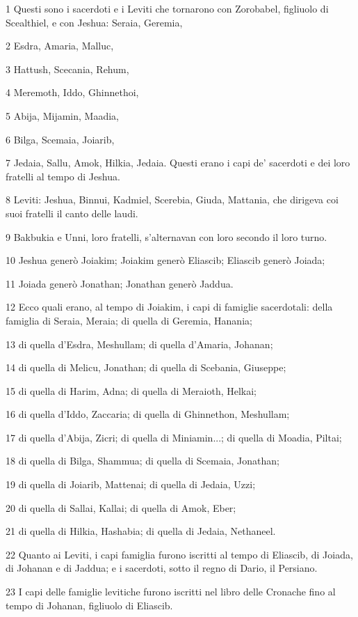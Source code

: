 \par 1 Questi sono i sacerdoti e i Leviti che tornarono con Zorobabel, figliuolo di Scealthiel, e con Jeshua: Seraia, Geremia,
\par 2 Esdra, Amaria, Malluc,
\par 3 Hattush, Scecania, Rehum,
\par 4 Meremoth, Iddo, Ghinnethoi,
\par 5 Abija, Mijamin, Maadia,
\par 6 Bilga, Scemaia, Joiarib,
\par 7 Jedaia, Sallu, Amok, Hilkia, Jedaia. Questi erano i capi de' sacerdoti e dei loro fratelli al tempo di Jeshua.
\par 8 Leviti: Jeshua, Binnui, Kadmiel, Scerebia, Giuda, Mattania, che dirigeva coi suoi fratelli il canto delle laudi.
\par 9 Bakbukia e Unni, loro fratelli, s'alternavan con loro secondo il loro turno.
\par 10 Jeshua generò Joiakim; Joiakim generò Eliascib; Eliascib generò Joiada;
\par 11 Joiada generò Jonathan; Jonathan generò Jaddua.
\par 12 Ecco quali erano, al tempo di Joiakim, i capi di famiglie sacerdotali: della famiglia di Seraia, Meraia; di quella di Geremia, Hanania;
\par 13 di quella d'Esdra, Meshullam; di quella d'Amaria, Johanan;
\par 14 di quella di Melicu, Jonathan; di quella di Scebania, Giuseppe;
\par 15 di quella di Harim, Adna; di quella di Meraioth, Helkai;
\par 16 di quella d'Iddo, Zaccaria; di quella di Ghinnethon, Meshullam;
\par 17 di quella d'Abija, Zicri; di quella di Miniamin...; di quella di Moadia, Piltai;
\par 18 di quella di Bilga, Shammua; di quella di Scemaia, Jonathan;
\par 19 di quella di Joiarib, Mattenai; di quella di Jedaia, Uzzi;
\par 20 di quella di Sallai, Kallai; di quella di Amok, Eber;
\par 21 di quella di Hilkia, Hashabia; di quella di Jedaia, Nethaneel.
\par 22 Quanto ai Leviti, i capi famiglia furono iscritti al tempo di Eliascib, di Joiada, di Johanan e di Jaddua; e i sacerdoti, sotto il regno di Dario, il Persiano.
\par 23 I capi delle famiglie levitiche furono iscritti nel libro delle Cronache fino al tempo di Johanan, figliuolo di Eliascib.

